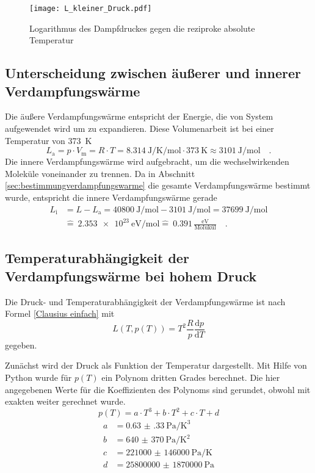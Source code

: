 \begin{figure}[h!]
	\centering
	\texttt{[image: L\_kleiner\_Druck.pdf]}
	\caption{Logarithmus des Dampfdruckes gegen die reziproke absolute Temperatur}
	\label{fig:L_kleiner_Druck}
\end{figure}

\subsection{Unterscheidung zwischen äußerer und innerer Verdampfungswärme}
Die äußere Verdampfungswärme entspricht der Energie, die von System aufgewendet wird um zu expandieren. Diese Volumenarbeit ist bei einer Temperatur von  \SI{373}{\kelvin}
\begin{equation}
L_\text{a} = p \cdot V_\text{m} = R \cdot T = \SI{8.314}{\joule\per\kelvin\per\mol} \cdot  \SI{373}{\kelvin} \approx \SI{3101}{\joule\per\mol} \quad.
\end{equation}
Die innere Verdampfungswärme wird aufgebracht, um die wechselwirkenden Moleküle voneinander zu trennen. Da in Abschnitt \ref{sec:bestimmungverdampfungswarme} die gesamte Verdampfungswärme bestimmt wurde, entspricht die innere Verdampfungswärme gerade
\begin{align}
L_\text{i} &= L - L_{\text{a}} = \SI{40800}{\joule\per\mol} - \SI{3101}{\joule\per\mol} = \SI{37699}{\joule\per\mol} \\
&\widehat{=} \ \SI{2.353e23}{\eV\per\mol} \widehat{=} \ 0.391 \, \frac{\si{\eV}}{\text{Molukül}}\quad.
\end{align}





\subsection{Temperaturabhängigkeit der Verdampfungswärme bei hohem Druck}
Die Druck- und Temperaturabhängigkeit der Verdampfungswärme ist nach Formel \eqref{Clausius einfach} mit
\begin{equation}
	L(T, p(T)) = T^2\frac{R}{p}\frac{\text{d}p}{\text{d}T}
\end{equation} gegeben.

Zunächst wird der Druck als Funktion der Temperatur dargestellt. Mit Hilfe von Python wurde für $p(T)$ ein Polynom dritten Grades berechnet. Die hier angegebenen Werte für die Koeffizienten des Polynoms sind gerundet, obwohl mit exakten weiter gerechnet wurde.
\begin{equation}
p(T) = a \cdot T ^3 + b \cdot T^2 +c \cdot T + d
\end{equation}
\begin{align}
a &=\SI{0.63(33)}{\pascal\per\kelvin\cubed}  \\
b &= \SI[per-mode = fraction]{640(370)}{\pascal\per\kelvin\squared}  \\
c &= \SI{221000(146000)}{\pascal\per\kelvin} \\
d  &= \SI{25800000(1870000)}{\pascal}
\end{align}


